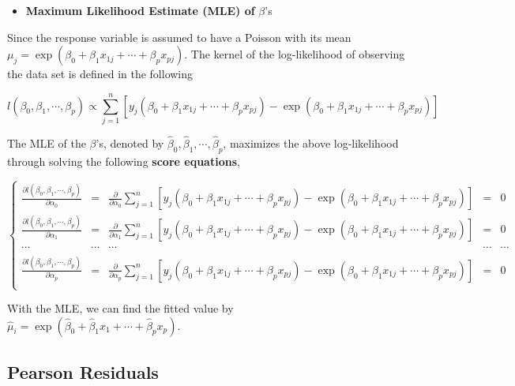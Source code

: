 \documentclass[
]{book}
\providecommand{\tightlist}{%
  \setlength{\itemsep}{0pt}\setlength{\parskip}{0pt}}
\begin{document}
\begin{itemize}
\tightlist
\item
  \textbf{Maximum Likelihood Estimate (MLE) of} \(\beta\)'s
\end{itemize}

Since the response variable is assumed to have a Poisson with its mean \(\mu_j = \exp(\beta_0 + \beta_1 x_{1j} + \cdots + \beta_p x_{pj})\). The kernel of the log-likelihood of observing the data set is defined in the following

\[
l(\beta_0, \beta_1, \cdots, \beta_p) \propto  \sum_{j=1}^n \left[y_j(\beta_0 + \beta_1 x_{1j} + \cdots + \beta_p x_{pj})-\exp(\beta_0 + \beta_1 x_{1j} + \cdots + \beta_p x_{pj}) \right]
\]

The MLE of the \(\beta\)'s, denoted by \(\hat{\beta}_0, \hat{\beta}_1, \cdots, \hat{\beta}_p\), maximizes the above log-likelihood through solving the following \textbf{score equations},

\[
\left\{
\begin{array}{ccccc}
\frac{\partial l(\beta_0, \beta_1, \cdots, \beta_p)}{\partial \alpha_0} & = & \frac{\partial}{\partial \alpha_0}\sum_{j=1}^n \left[y_j(\beta_0 + \beta_1 x_{1j} + \cdots + \beta_p x_{pj})-\exp(\beta_0 + \beta_1 x_{1j} + \cdots + \beta_p x_{pj}) \right] & = & 0 \\
\frac{\partial l(\beta_0, \beta_1, \cdots, \beta_p)}{\partial \alpha_1} & = & \frac{\partial}{\partial \alpha_1}\sum_{j=1}^n \left[y_j(\beta_0 + \beta_1 x_{1j} + \cdots + \beta_p x_{pj})-\exp(\beta_0 + \beta_1 x_{1j} + \cdots + \beta_p x_{pj}) \right]& = & 0 \\
\cdots & \cdots &\cdots & \cdots &\cdots\\
\frac{\partial l(\beta_0, \beta_1, \cdots, \beta_p)}{\partial \alpha_{p}} & = & \frac{\partial}{\partial \alpha_p}\sum_{j=1}^n \left[y_j(\beta_0 + \beta_1 x_{1j} + \cdots + \beta_p x_{pj})-\exp(\beta_0 + \beta_1 x_{1j} + \cdots + \beta_p x_{pj}) \right]& = & 0  \\
\end{array}
\right.
\]

With the MLE, we can find the fitted value by \(\hat{\mu}_i = \exp(\hat{\beta}_0 + \hat{\beta}_1 x_1 + \cdots + \hat{\beta}_p x_p)\).

\hypertarget{pearson-residuals}{%
\subsection{Pearson Residuals}\label{pearson-residuals}}
\end{document}
